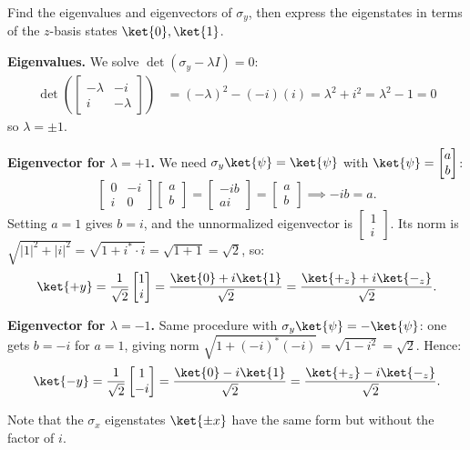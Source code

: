 \documentclass[oneside]{academica}
\begin{document}
\begin{exercise*}
  Find the eigenvalues and eigenvectors of $\sigma_y$, then express the eigenstates in terms of the $z$-basis states $\ket{0},\ket{1}$.

  \textbf{Eigenvalues.}
  We solve $\det(\sigma_y-\lambda I)=0$:
  \begin{align*}
    \det\!\left(\begin{bmatrix}-\lambda&-i\\i&-\lambda\end{bmatrix}\right)
    &= (-\lambda)^2 - (-i)(i) = \lambda^2 + i^2 = \lambda^2 - 1 = 0
  \end{align*}
  so $\lambda = \pm 1$.

  \textbf{Eigenvector for $\lambda=+1$.}
  We need $\sigma_y\ket{\psi}=\ket{\psi}$ with $\ket{\psi}=\begin{bmatrix}a\\b\end{bmatrix}$:
  \begin{equation*}
    \begin{bmatrix}0&-i\\i&0\end{bmatrix}\begin{bmatrix}a\\b\end{bmatrix}
    = \begin{bmatrix}-ib\\ai\end{bmatrix}
    = \begin{bmatrix}a\\b\end{bmatrix}
    \implies -ib = a.
  \end{equation*}
  Setting $a=1$ gives $b=i$, and the unnormalized eigenvector is $\begin{bmatrix}1\\i\end{bmatrix}$.
  Its norm is $\sqrt{|1|^2+|i|^2}=\sqrt{1+i^*\cdot i}=\sqrt{1+1}=\sqrt{2}$, so:
  \begin{equation*}
    \ket{+y} = \frac{1}{\sqrt{2}}\begin{bmatrix}1\\i\end{bmatrix}
             = \frac{\ket{0}+i\ket{1}}{\sqrt{2}}
             = \frac{\ket{+_z}+i\ket{-_z}}{\sqrt{2}}.
  \end{equation*}

  \textbf{Eigenvector for $\lambda=-1$.}
  Same procedure with $\sigma_y\ket{\psi}=-\ket{\psi}$: one gets $b=-i$ for $a=1$, giving norm $\sqrt{1+(-i)^*(- i)}=\sqrt{1-i^2}=\sqrt{2}$.
  Hence:
  \begin{equation*}
    \ket{-y} = \frac{1}{\sqrt{2}}\begin{bmatrix}1\\-i\end{bmatrix}
             = \frac{\ket{0}-i\ket{1}}{\sqrt{2}}
             = \frac{\ket{+_z}-i\ket{-_z}}{\sqrt{2}}.
  \end{equation*}

  Note that the $\sigma_x$ eigenstates $\ket{\pm x}$ have the same form but without the factor of $i$.
\end{exercise*}
\end{document}
